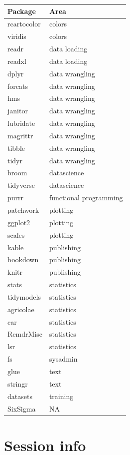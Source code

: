 \documentclass[
]{book}
\begin{document}
\begin{tabular}{l|l}
\hline
Package & Area\\
\hline
rcartocolor & colors\\
\hline
viridis & colors\\
\hline
readr & data loading\\
\hline
readxl & data loading\\
\hline
dplyr & data wrangling\\
\hline
forcats & data wrangling\\
\hline
hms & data wrangling\\
\hline
janitor & data wrangling\\
\hline
lubridate & data wrangling\\
\hline
magrittr & data wrangling\\
\hline
tibble & data wrangling\\
\hline
tidyr & data wrangling\\
\hline
broom & datascience\\
\hline
tidyverse & datascience\\
\hline
purrr & functional programming\\
\hline
patchwork & plotting\\
\hline
ggplot2 & plotting\\
\hline
scales & plotting\\
\hline
kable & publishing\\
\hline
bookdown & publishing\\
\hline
knitr & publishing\\
\hline
stats & statistics\\
\hline
tidymodels & statistics\\
\hline
agricolae & statistics\\
\hline
car & statistics\\
\hline
RcmdrMisc & statistics\\
\hline
lsr & statistics\\
\hline
fs & sysadmin\\
\hline
glue & text\\
\hline
stringr & text\\
\hline
datasets & training\\
\hline
SixSigma & NA\\
\hline
\end{tabular}

\hypertarget{session-info}{%
\section{Session info}\label{session-info}}
\end{document}
